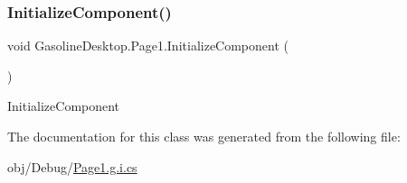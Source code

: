 \subsubsection{\texorpdfstring{InitializeComponent()}{InitializeComponent()}}
{\footnotesize\ttfamily void Gasoline\+Desktop.\+Page1.\+Initialize\+Component (\begin{DoxyParamCaption}{ }\end{DoxyParamCaption})}



Initialize\+Component 



The documentation for this class was generated from the following file\+:\begin{DoxyCompactItemize}
\item 
obj/\+Debug/\mbox{\hyperlink{_page1_8g_8i_8cs}{Page1.\+g.\+i.\+cs}}\end{DoxyCompactItemize}
